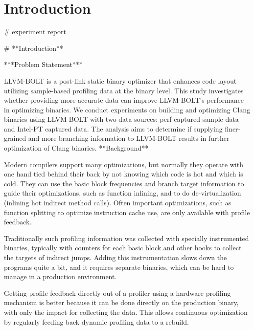 \endofdump

\maketitle

\begin{abstract}
\noindent
\end{abstract}


\section{Introduction}
# experiment report

# **Introduction**

***Problem Statement***

LLVM-BOLT is a post-link static binary optimizer that enhances code layout utilizing 
sample-based profiling data at the binary level. This study investigates whether providing
more accurate data can improve LLVM-BOLT's performance in optimizing binaries. We conduct 
experiments on building and optimizing Clang binaries using LLVM-BOLT with two data sources: 
perf-captured sample data and Intel-PT captured data. The analysis aims to determine if supplying 
finer-grained and more branching information to LLVM-BOLT results in further optimization
of Clang binaries.
**Background** 

Modern compilers support many optimizations, but normally they operate with one hand tied behind their back by not knowing which code is hot and which is cold. They can use the basic block frequencies and branch target information to guide their optimizations, such as function inlining, and to do de-virtualization (inlining hot indirect method calls). Often important optimizations, such as function splitting to optimize instruction cache use, are only available with profile feedback.

Traditionally such profiling information was collected with specially instrumented binaries, typically with counters for each basic block and other hooks to collect the targets of indirect jumps. Adding this instrumentation slows down the programs quite a bit, and it requires separate binaries, which can be hard to manage in a production environment.

Getting profile feedback directly out of a profiler using a hardware profiling mechanism is better because it can be done directly on the production binary, with only the impact for collecting the data. This allows continuous optimization by regularly feeding back dynamic profiling data to a rebuild.

